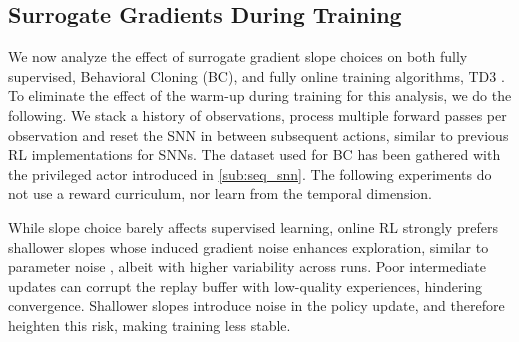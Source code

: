 \subsection{Surrogate Gradients During Training}
We now analyze the effect of surrogate gradient slope choices on both fully supervised, Behavioral Cloning (BC), and fully online training algorithms, TD3 \cite{fujimoto2018addressing}. To eliminate the effect of the warm-up during training for this analysis, we do the following. We stack a history of observations, process multiple forward passes per observation and reset the SNN in between subsequent actions, similar to previous RL implementations for SNNs. The dataset used for BC has been gathered with the privileged actor introduced in \autoref{sub:seq_snn}. The following experiments do not use a reward curriculum, nor learn from the temporal dimension.

While slope choice barely affects supervised learning, online RL strongly prefers shallower slopes whose induced gradient noise enhances exploration, similar to parameter noise \cite{plappert2017parameter}, albeit with higher variability across runs. Poor intermediate updates can corrupt the replay buffer with low-quality experiences, hindering convergence. Shallower slopes introduce noise in the policy update, and therefore heighten this risk, making training less stable. 

